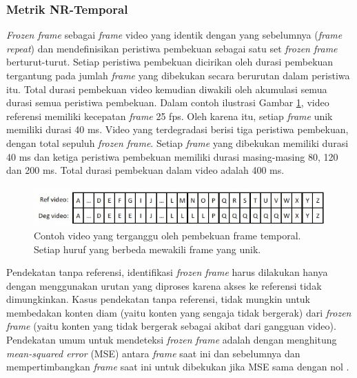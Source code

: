\subsubsection{Metrik NR-Temporal}

\textit{Frozen frame} sebagai \textit{frame} video yang identik dengan yang sebelumnya (\textit{frame repeat}) dan mendefinisikan peristiwa pembekuan sebagai satu set \textit{frozen frame} berturut-turut. Setiap peristiwa pembekuan dicirikan oleh durasi pembekuan tergantung pada jumlah \textit{frame} yang dibekukan secara berurutan dalam peristiwa itu. Total durasi pembekuan video kemudian diwakili oleh akumulasi semua durasi semua peristiwa pembekuan. Dalam contoh ilustrasi Gambar \ref{Contoh video yang terganggu oleh pembekuan frame temporal. Setiap huruf yang berbeda mewakili frame yang unik}, video referensi memiliki kecepatan \textit{frame} 25 fps. Oleh karena itu, setiap \textit{frame} unik memiliki durasi 40 ms. Video yang terdegradasi berisi tiga peristiwa pembekuan, dengan total sepuluh \textit{frozen frame}. Setiap \textit{frame} yang dibekukan memiliki durasi 40 ms dan ketiga peristiwa pembekuan memiliki durasi masing-masing 80, 120 dan 200 ms. Total durasi pembekuan dalam video adalah 400 ms.

\begin{figure}[H]
	\vspace{-0.1cm}
	\begin{center}
		\includegraphics[width=0.9\columnwidth]{bab2/Gambar/Contoh video yang terganggu oleh pembekuan frame temporal. Setiap huruf yang berbeda mewakili frame yang unik.jpg}
	\end{center}
	\vspace{-0.2cm}
	\caption{Contoh video yang terganggu oleh pembekuan frame temporal. Setiap huruf yang berbeda mewakili frame yang unik. \citep{Quan_Huynh_Thu_2009}}\label{Contoh video yang terganggu oleh pembekuan frame temporal. Setiap huruf yang berbeda mewakili frame yang unik}
\end{figure}

Pendekatan tanpa referensi, identifikasi \textit{frozen frame} harus dilakukan hanya dengan menggunakan urutan yang diproses karena akses ke referensi tidak dimungkinkan. Kasus pendekatan tanpa referensi, tidak mungkin untuk membedakan konten diam (yaitu konten yang sengaja tidak bergerak) dari \textit{frozen frame} (yaitu konten yang tidak bergerak sebagai akibat dari gangguan video). Pendekatan umum untuk mendeteksi \textit{frozen frame} adalah dengan menghitung \textit{mean-squared error} (MSE) antara \textit{frame} saat ini dan sebelumnya dan mempertimbangkan \textit{frame} saat ini untuk dibekukan jika MSE sama dengan nol \citep{Quan_Huynh_Thu_2009}.

